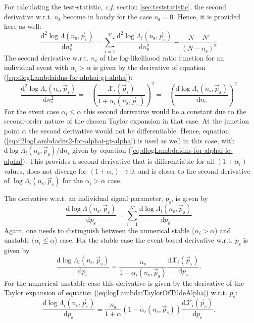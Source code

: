 \documentclass{article}
\newcommand{\ns}{n_{\mathrm{s}}}
\newcommand{\ps}{\vec{p}_{\mathrm{s}}}
\begin{document}
For calculating the test-statistic, \emph{c.f.} section \ref{sec:teststatistic},
the second derivative w.r.t. $\ns$ become in handy for the case $\ns=0$. Hence,
it is provided here as well:
\begin{equation}
 \frac{\mathrm{d}^2\log\Lambda(\ns,\ps)}{\mathrm{d} \ns^2} = \sum_{i=1}^{N'} \frac{\mathrm{d}^2 \log \Lambda_i(\ns,\ps)}{\mathrm{d} \ns^2} - \frac{N-N'}{(N - \ns)^2}
\end{equation}
The second derivative w.r.t. $\ns$ of the log-likelihood ratio function for an
individual event with $\alpha_i > \alpha$ is given by the derivative of equation
(\ref{eq:dlogLambdaidns-for-alphai-gt-alpha}):
\begin{equation}
 \frac{\mathrm{d}^2\log\Lambda_i(\ns,\ps)}{\mathrm{d} \ns^2} = - \left(\frac{\mathcal{X}_i(\ps)}{1+\alpha_i(\ns,\ps)}\right)^2 = - \left( \frac{\mathrm{d} \log \Lambda_i(\ns,\ps)}{\mathrm{d} \ns} \right)^2
 \label{eq:d2logLambdadns2-for-alphai-gt-alpha}
\end{equation}
For the event case $\alpha_i \le \alpha$ this second derivative would be a
constant due to the second-order nature of the chosen Taylor expansion in that
case. At the junction point $\alpha$ the second derivative would not be differentiable.
Hence, equation (\ref{eq:d2logLambdadns2-for-alphai-gt-alpha}) is used as well
in this case, with $\mathrm{d}\log\Lambda_i(\ns,\ps)/\mathrm{d}\ns$ given by
equation (\ref{eq:dlogLambdaidns-for-alphai-le-alpha}). This provides a second
derivative that is differentiable for all $(1 + \alpha_i)$ values, does not
diverge for $(1 + \alpha_i) \rightarrow 0$, and is closer to the second
derivative of $\log\Lambda_i(\ns,\ps)$ for the $\alpha_i > \alpha$ case.

The derivative w.r.t. an individual signal parameter, $p_{\mathrm{s}}$, is given by
\begin{equation}
 \frac{\mathrm{d} \log \Lambda(\ns,\ps)}{\mathrm{d} p_{\mathrm{s}}} = \sum_{i=1}^{N'} \frac{\mathrm{d}\log\Lambda_i(\ns,\ps)}{\mathrm{d}p_{\mathrm{s}}}
\end{equation}
Again, one needs to distinguish between the numerical stable ($\alpha_i > \alpha$)
and unstable ($\alpha_i \leq \alpha$) case.
For the stable case the event-based derivative w.r.t. $p_{\mathrm{s}}$ is given by
\begin{equation}
 \frac{\mathrm{d}\log\Lambda_i(\ns,\ps)}{\mathrm{d}p_{\mathrm{s}}} = \frac{\ns}{1+\alpha_i(\ns,\ps)} \frac{\mathrm{d}\mathcal{X}_i(\ps)}{\mathrm{d}p_{\mathrm{s}}}.
\end{equation}
For the numerical unstable case this derivative is
given by the derivative of the Taylor expansion of equation (\ref{eq:logLambdaiTaylorOfTildeAlpha})
w.r.t. $p_{\mathrm{s}}$:
\begin{equation}
 \frac{\mathrm{d}\log\Lambda_i(\ns,\ps)}{\mathrm{d}p_{\mathrm{s}}} = \frac{\ns}{1+\alpha}\left(1 - \tilde{\alpha}_i(\ns,\ps)\right) \frac{\mathrm{d}\mathcal{X}_i(\ps)}{\mathrm{d}p_{\mathrm{s}}}.
\end{equation}
\end{document}

